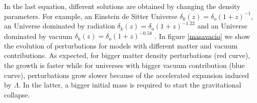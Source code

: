 In the last equation, different solutions are obtained by changing the density parameters. 
For example, an Einstein de Sitter Universe $\delta_k(z)=\delta_o(1+z)^{-1}$,  
an Universe dominated by radiation $\delta_k(z)=\delta_o(1+z)^{-1.22}$ and
an Universe dominated by vacuum $\delta_k(z)=\delta_o(1+z)^{-0.58}$ \cite{Longair}. 
In figure \ref{masavacio} we show the evolution of perturbations for models with
different matter and vacuum contributions. As expected, for bigger matter density
perturbations (red curve), the growth is faster while for universes with bigger vacuum contribution (blue curve), perturbations grow slower because of the accelerated expansion induced by $\Lambda$. 
In the latter, a bigger initial mass is required to start the gravitational collapse.

